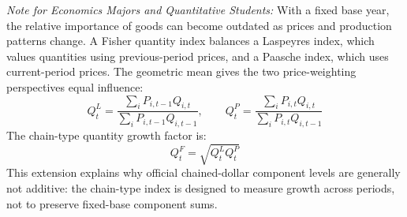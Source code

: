 \documentclass[11pt,letterpaper]{article}
\begin{document}
\begin{tcolorbox}[colback=blue!5!white,colframe=blue!75!black,title=\textbf{Optional Advanced Section: Chain-Weighted Real GDP Indices}]
\small
\emph{Note for Economics Majors and Quantitative Students:}
With a fixed base year, the relative importance of goods can become outdated as prices and production patterns change. A Fisher quantity index balances a Laspeyres index, which values quantities using previous-period prices, and a Paasche index, which uses current-period prices. The geometric mean gives the two price-weighting perspectives equal influence:
\[
Q_t^{L} = \frac{\sum_i P_{i,t-1}Q_{i,t}}{\sum_i P_{i,t-1}Q_{i,t-1}}, \qquad
Q_t^{P} = \frac{\sum_i P_{i,t}Q_{i,t}}{\sum_i P_{i,t}Q_{i,t-1}}
\]
The chain-type quantity growth factor is:
\[
Q_t^{F} = \sqrt{Q_t^{L}Q_t^{P}}
\]
This extension explains why official chained-dollar component levels are generally not additive: the chain-type index is designed to measure growth across periods, not to preserve fixed-base component sums.
\end{tcolorbox}
\end{document}
